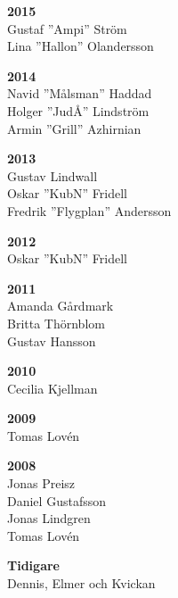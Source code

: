 {\begin{multicols}{2}
\textbf{2015}\\
Gustaf ''Ampi'' Ström\\
Lina ''Hallon'' Olandersson

\textbf{2014}\\
Navid ''Målsman'' Haddad\\
Holger ''JudÅ'' Lindström\\
Armin ''Grill'' Azhirnian

\textbf{2013}\\
Gustav Lindwall\\
Oskar ''KubN'' Fridell\\
Fredrik ''Flygplan'' Andersson

\textbf{2012}\\
Oskar ''KubN'' Fridell

\textbf{2011}\\
Amanda Gårdmark\\
Britta Thörnblom\\
Gustav Hansson

\textbf{2010}\\
Cecilia Kjellman

\textbf{2009}\\
Tomas Lovén

\textbf{2008}\\
Jonas Preisz\\
Daniel Gustafsson\\
Jonas Lindgren\\
Tomas Lovén

\textbf{Tidigare}\\
Dennis, Elmer och Kvickan
\end{multicols}
}
